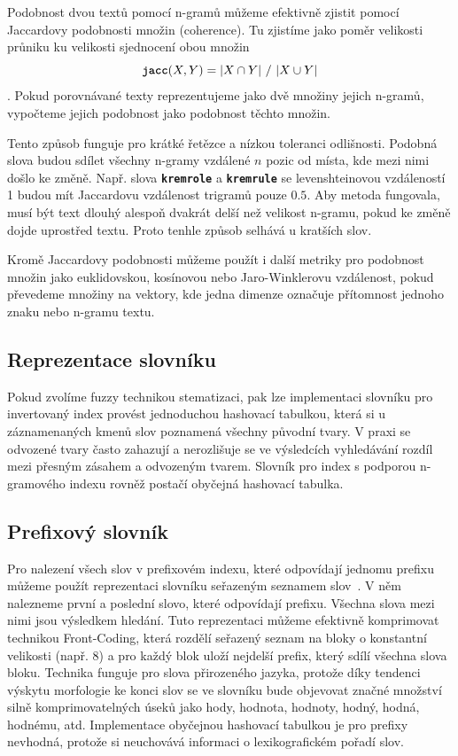 \documentclass[11pt,letterpaper,oneside,openright]{book}
\newcommand{\bftt}[1]{\texttt{\textbf{#1}}}
\begin{document}
Podobnost dvou textů pomocí n-gramů můžeme efektivně zjistit pomocí Jaccardovy
podobnosti množin (coherence). Tu zjistíme jako poměr velikosti průniku ku
velikosti sjednocení obou množin \[\bftt{jacc}(X, Y) = |X \cap Y|\ /\ |X \cup
Y|\]. Pokud porovnávané texty reprezentujeme jako dvě množiny jejich n-gramů,
vypočteme jejich podobnost jako podobnost těchto množin.

Tento způsob funguje pro krátké řetězce a nízkou toleranci odlišnosti. Podobná
slova budou sdílet všechny n-gramy vzdálené $n$ pozic od místa, kde mezi nimi
došlo ke změně. Např. slova \bftt{kremrole} a \bftt{kremrule} se
levenshteinovou vzdáleností 1 budou mít Jaccardovu vzdálenost trigramů pouze
$0.5$. Aby metoda fungovala, musí být text dlouhý alespoň dvakrát delší než
velikost n-gramu, pokud ke změně dojde uprostřed textu. Proto tenhle způsob
selhává u kratších slov.

Kromě Jaccardovy podobnosti můžeme použít i další metriky pro podobnost množin
jako euklidovskou, kosínovou nebo Jaro-Winklerovu vzdálenost, pokud převedeme
množiny na vektory, kde jedna dimenze označuje přítomnost jednoho znaku nebo
n-gramu textu.


\subsection{Reprezentace slovníku}
Pokud zvolíme fuzzy technikou stematizaci, pak lze implementaci slovníku pro
invertovaný index provést jednoduchou hashovací tabulkou, která si u
záznamenaných kmenů slov poznamená všechny původní tvary. V praxi se odvozené
tvary často zahazují a nerozlišuje se ve výsledcích vyhledávání rozdíl mezi
přesným zásahem a odvozeným tvarem. Slovník pro index s podporou n-gramového
indexu rovněž postačí obyčejná hashovací tabulka.

\subsection{Prefixový slovník}
Pro nalezení všech slov v prefixovém indexu, které odpovídají jednomu prefixu
můžeme použít reprezentaci slovníku seřazeným seznamem
slov~\citep[kap.~4]{buttcher2010information}. V něm nalezneme první a poslední
slovo, které odpovídají prefixu. Všechna slova mezi nimi jsou výsledkem
hledání.  Tuto reprezentaci můžeme efektivně komprimovat technikou
Front-Coding, která rozdělí seřazený seznam na bloky o konstantní velikosti
(např. 8) a pro každý blok uloží nejdelší prefix, který sdílí všechna slova
bloku. Technika funguje pro slova přirozeného jazyka, protože díky tendenci
výskytu morfologie ke konci slov se ve slovníku bude objevovat značné množství
silně komprimovatelných úseků jako hody, hodnota, hodnoty, hodný, hodná,
hodnému, atd. Implementace obyčejnou hashovací tabulkou je pro prefixy
nevhodná, protože si neuchovává informaci o lexikografickém pořadí slov.
\end{document}
